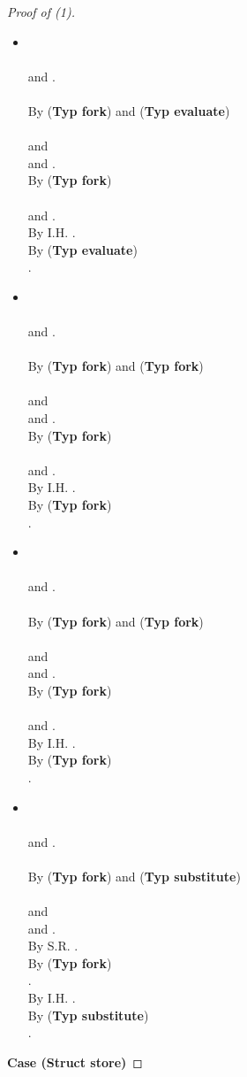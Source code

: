 \documentclass{sigplanconf}
\newcommand{\trule}[1]{(\textbf{Typ #1})}
\begin{document}
\begin{proof}[Proof of (1)]
\begin{itemize}
\item 
\\
\\
 and .\\
  \\
By \trule{fork} and \trule{evaluate} \\
 \\
 and \\  
 and .\\
By \trule{fork} \\
 \\  
 and .\\
By I.H. .\\
By \trule{evaluate} \\
 .\\
\item 
\\
\\
 and .\\
  \\
By \trule{fork} and \trule{fork} \\
 \\
 and \\  
 and .\\
By \trule{fork} \\
 \\  
 and .\\
By I.H. .\\
By \trule{fork} \\
 .\\
\item 
\\
\\
 and .\\
  \\
By \trule{fork} and \trule{fork} \\
 \\
 and \\  
 and .\\
By \trule{fork} \\
 \\  
 and .\\
By I.H. .\\
By \trule{fork} \\
 .\\
\item 
\\
\\
 and .\\
  \\
By \trule{fork} and \trule{substitute} \\
 \\
 and \\
 and .\\
By S.R. .\\
By \trule{fork} \\
 .\\
By I.H. .\\
By \trule{substitute} \\
 .
\end{itemize}
{\bf Case (Struct store)}
    

\end{proof}
\end{document}
